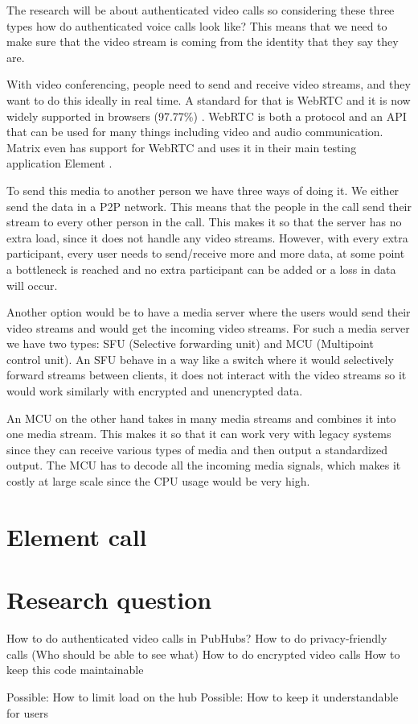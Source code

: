 \documentclass[11pt,a4paper]{article}
\begin{document}
The research will be about authenticated video calls so considering these three types how do authenticated voice calls look like? This means that we need to make sure that the video stream is coming from the identity that they say they are. 

With video conferencing, people need to send and receive video streams, and they want to do this ideally in real time. A standard for that is WebRTC and it is now widely supported in browsers (97.77\%) \cite{CIUIWEBRTC}. WebRTC is both a protocol and an API that can be used for many things including video and audio communication. Matrix even has support for WebRTC and uses it in their main testing application Element \cite{ELEMENT}. 

To send this media to another person we have three ways of doing it. We either send the data in a P2P network. This means that the people in the call send their stream to every other person in the call. This makes it so that the server has no extra load, since it does not handle any video streams. However, with every extra participant, every user needs to send/receive more and more data, at some point a bottleneck is reached and no extra participant can be added or a loss in data will occur. 

Another option would be to have a media server where the users would send their video streams and would get the incoming video streams. For such a media server we have two types: SFU (Selective forwarding unit) and MCU (Multipoint control unit). An SFU behave in a way like a switch where it would selectively forward streams between clients, it does not interact with the video streams so it would work similarly with encrypted and unencrypted data.  

An MCU on the other hand takes in many media streams and combines it into one media stream. This makes it so that it can work very with legacy systems since they can receive various types of media and then output a standardized output. The MCU has to decode all the incoming media signals, which makes it costly at large scale since the CPU usage would be very high.

\section{Element call}


\section{Research question}

How to do authenticated video calls in PubHubs?
    How to do privacy-friendly calls (Who should be able to see what)
    How to do encrypted video calls
    How to keep this code maintainable
    
Possible: How to limit load on the hub
Possible: How to keep it understandable for users    



\end{document}
